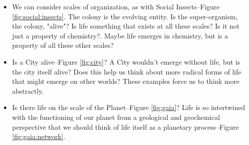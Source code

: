 \documentclass[]{article}
\begin{document}
\begin{itemize}
		\item We can consider scales of organization, as with Social Insects--Figure \ref{fig:social:insects}. The colony is the evolving entity. Is the super-organism, the colony, "alive"? Is life something that exists at all these scales? Is it not just a property of chemistry?\cite{pratt2015psychology}. Maybe life emerges in chemistry, but is a property of all these other scales?
	\item Is a City alive--Figure \ref{fig:city}? A City wouldn't emerge without life, but is the city itself alive? Does this help us think about more radical forms of life that might emerge on other worlds? These examples force us to think more abstractly.
	\item Is there life on the scale of the Planet\cite{lovelock1974atmospheric}--Figure \ref{fig:gaia}? Life is so intertwined with the functioning of our planet from a geological and geochemical perspective that we should think of life itself as a planetary process--Figure \ref{fig:gaia:network}. 
\end{itemize}
\end{document}
